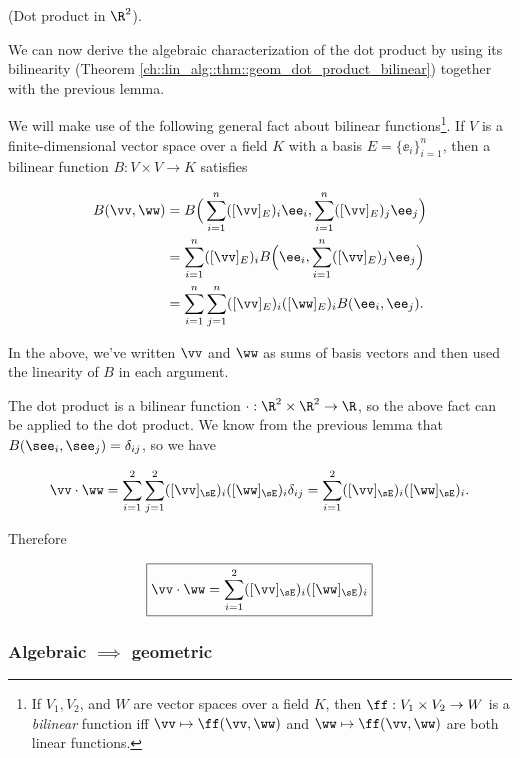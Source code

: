 \begin{deriv}
    (Dot product in $\R^2$). 
    
    We can now derive the algebraic characterization of the dot product by using its bilinearity (Theorem \ref{ch::lin_alg::thm::geom_dot_product_bilinear}) together with the previous lemma.
    
    We will make use of the following general fact about bilinear functions\footnote{If $V_1, V_2$, and $W$ are vector spaces over a field $K$, then $\ff:V_1 \times V_2 \rightarrow W$ is a \textit{bilinear} function iff $\vv \mapsto \ff(\vv, \ww)$ and $\ww \mapsto \ff(\vv, \ww)$ are both linear functions.}. If $V$ is a finite-dimensional vector space over a field $K$ with a basis $E = \{\ee_i\}_{i = 1}^n$, then a bilinear function $B:V \times V \rightarrow K$ satisfies
    
    \begin{align*}
        B(\vv, \ww) &= B\Big(\sum_{i = 1}^n ([\vv]_E)_i \ee_i, \sum_{i = 1}^n ([\vv]_E)_j \ee_j\Big) \\
        &= \sum_{i = 1}^n ([\vv]_E)_i B\Big(\ee_i, \sum_{i = 1}^n ([\vv]_E)_j \ee_j\Big) \\
        &= \sum_{i = 1}^n \sum_{j = 1}^n ([\vv]_E)_i ([\ww]_E)_i B(\ee_i, \ee_j).
    \end{align*}
    
    In the above, we've written $\vv$ and $\ww$ as sums of basis vectors and then used the linearity of $B$ in each argument.
    
    The dot product is a bilinear function $\cdot:\R^2 \times \R^2 \rightarrow \R$, so the above fact can be applied to the dot product. We know from the previous lemma that $B(\see_i, \see_j) = \delta_{ij}$, so we have
    
    \begin{align*}
        \vv \cdot \ww = \sum_{i = 1}^2 \sum_{j = 1}^2 ([\vv]_\sE)_i ([\ww]_\sE)_i \delta_{ij} = \sum_{i = 1}^2 ([\vv]_\sE)_i ([\ww]_\sE)_i.
    \end{align*}
    
    Therefore
    
    \begin{align*}
        \boxed
        {
            \vv \cdot \ww = \sum_{i = 1}^2 ([\vv]_\sE)_i ([\ww]_\sE)_i
        }
    \end{align*}
\end{deriv}

\subsubsection*{Algebraic $\implies$ geometric}

